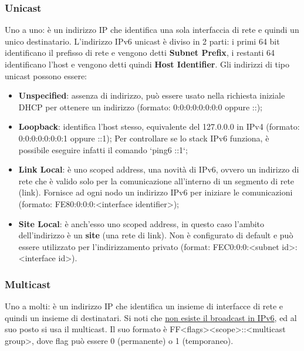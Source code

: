 \documentclass{article}
\begin{document}
            \subsubsection*{Unicast}
            Uno a uno: è un indirizzo IP che identifica una sola interfaccia di rete e quindi un unico
            destinatario. L’indirizzo IPv6 unicast è diviso in 2 parti: i primi 64 bit identificano il prefisso di
            rete e vengono detti \textbf{Subnet Prefix}, i restanti 64 identificano l’host e vengono detti quindi \textbf{Host
            Identifier}. Gli indirizzi di tipo unicast possono essere:
            \begin{itemize}
                \item \textbf{Unspecified}: assenza di indirizzo, può essere usato nella richiesta iniziale DHCP per
                ottenere un indirizzo (formato: 0:0:0:0:0:0:0:0 oppure ::);
                \item \textbf{Loopback}: identifica l’host stesso, equivalente del 127.0.0.0 in IPv4
                (formato: 0:0:0:0:0:0:0:1 oppure ::1); Per controllare se lo stack IPv6 funziona, è
                possibile eseguire infatti il comando `ping6 ::1`;
                \item \textbf{Link Local}: è uno scoped address, una novità di IPv6, ovvero un indirizzo di rete che è
                valido solo per la comunicazione all’interno di un segmento di rete (link).
                Fornisce ad ogni nodo un indirizzo IPv6 per iniziare le comunicazioni
                (formato: FE80:0:0:0:<interface identifier>);
                \item \textbf{Site Local}: è anch’esso uno scoped address, in questo caso l’ambito dell’indirizzo è un
                \textbf{site} (una rete di link). Non è configurato di default e può essere utilizzato per
                l’indirizzamento privato (format: FEC0:0:0:<subnet id>:<interface id>).                
            \end{itemize}
            
            \subsubsection*{Multicast}
            Uno a molti: è un indirizzo IP che identifica un insieme di interfacce di rete e quindi un insieme
            di destinatari. Si noti che \underline{non esiste il broadcast in IPv6}, ed al suo posto si usa il multicast. Il suo
            formato è FF<flags><scope>::<multicast group>, dove flag può essere 0 (permanente) o 1
            (temporaneo).
\end{document}
